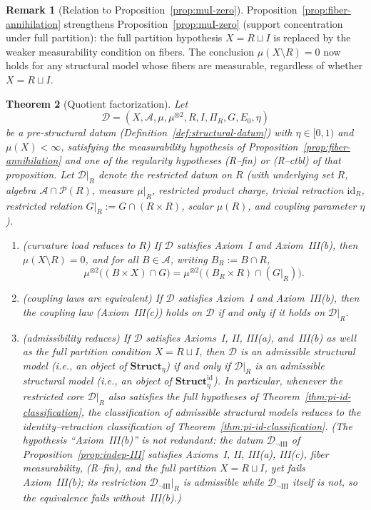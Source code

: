 \documentclass[11pt]{article}
\numberwithin{equation}{section}
\newtheorem{theorem}{Theorem}[section]
\theoremstyle{definition}
\newtheorem{remark}[theorem]{Remark}
\begin{document}
\begin{remark}[Relation to Proposition~\ref{prop:muI-zero}]\label{rem:fiber-vs-muI}
Proposition~\ref{prop:fiber-annihilation} strengthens Proposition~\ref{prop:muI-zero} (support concentration under full partition): the full partition hypothesis $X=R\sqcup I$ is replaced by the weaker measurability condition on fibers. The conclusion $\mu(X\setminus R)=0$ now holds for any structural model whose fibers are measurable, regardless of whether $X=R\sqcup I$.
\end{remark}

\begin{theorem}[Quotient factorization]\label{thm:quotient-factorization}
Let
\[
\mathcal D=(X,\mathcal A,\mu,\mu^{\otimes2},R,I,\Pi_R,G,E_0,\eta)
\]
be a pre-structural datum (Definition~\ref{def:structural-datum}) with $\eta\in[0,1)$ and $\mu(X)<\infty$, satisfying the measurability hypothesis of Proposition~\ref{prop:fiber-annihilation} and one of the regularity hypotheses \emph{(R--fin)} or \emph{(R--ctbl)} of that proposition. Let $\mathcal D|_R$ denote the restricted datum on $R$ (with underlying set $R$, algebra $\mathcal A\cap\mathcal P(R)$, measure $\mu|_R$, restricted product charge, trivial retraction $\mathrm{id}_R$, restricted relation $G|_R:=G\cap(R\times R)$, scalar $\mu(R)$, and coupling parameter $\eta$).
\begin{enumerate}[label=(\roman*)]
\item (\emph{curvature load reduces to $R$}) If $\mathcal D$ satisfies Axiom~I and Axiom~III(b), then $\mu(X\setminus R)=0$, and for all $B\in\mathcal A$, writing $B_R:=B\cap R$,
\[
\mu^{\otimes2}\bigl((B\times X)\cap G\bigr)=\mu^{\otimes2}\bigl((B_R\times R)\cap (G|_R)\bigr).
\]
\item (\emph{coupling laws are equivalent}) If $\mathcal D$ satisfies Axiom~I and Axiom~III(b), then the coupling law (Axiom~III(c)) holds on $\mathcal D$ if and only if it holds on $\mathcal D|_R$.
\item (\emph{admissibility reduces}) If $\mathcal D$ satisfies Axioms~I, II, III(a), and~III(b) as well as the full partition condition $X=R\sqcup I$, then $\mathcal D$ is an admissible structural model (i.e., an object of $\mathbf{Struct}_\eta$) if and only if $\mathcal D|_R$ is an admissible structural model (i.e., an object of $\mathbf{Struct}^{\mathrm{id}}_\eta$). In particular, whenever the restricted core $\mathcal D|_R$ also satisfies the full hypotheses of Theorem~\ref{thm:pi-id-classification}, the classification of admissible structural models reduces to the identity--retraction classification of Theorem~\ref{thm:pi-id-classification}. (The hypothesis ``Axiom~III(b)'' is not redundant: the datum $\mathcal D_{\neg\mathrm{III}}$ of Proposition~\ref{prop:indep-III} satisfies Axioms~I, II, III(a), III(c), fiber measurability, (R--fin), and the full partition $X=R\sqcup I$, yet fails Axiom~III(b); its restriction $\mathcal D_{\neg\mathrm{III}}|_R$ is admissible while $\mathcal D_{\neg\mathrm{III}}$ itself is not, so the equivalence fails without~III(b).)
\end{enumerate}
\end{theorem}
\end{document}
